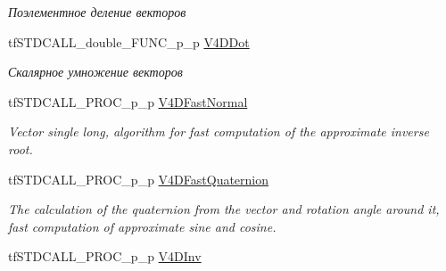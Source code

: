 \begin{DoxyCompactItemize}
\begin{DoxyCompactList}\small\item\em Поэлементное деление векторов \end{DoxyCompactList}\item 
\hypertarget{structs_functions_vector_c_p_u_a98050e36b034519869d873d3c4fab022}{tf\-S\-T\-D\-C\-A\-L\-L\-\_\-double\-\_\-\-F\-U\-N\-C\-\_\-p\-\_\-p \hyperlink{structs_functions_vector_c_p_u_a98050e36b034519869d873d3c4fab022}{V4\-D\-Dot}}\label{structs_functions_vector_c_p_u_a98050e36b034519869d873d3c4fab022}

\begin{DoxyCompactList}\small\item\em Скалярное умножение векторов \end{DoxyCompactList}\item 
\hypertarget{structs_functions_vector_c_p_u_a63b1e6bb5b43b6a398f61343a0495531}{tf\-S\-T\-D\-C\-A\-L\-L\-\_\-\-P\-R\-O\-C\-\_\-p\-\_\-p \hyperlink{structs_functions_vector_c_p_u_a63b1e6bb5b43b6a398f61343a0495531}{V4\-D\-Fast\-Normal}}\label{structs_functions_vector_c_p_u_a63b1e6bb5b43b6a398f61343a0495531}

\begin{DoxyCompactList}\small\item\em Vector single long, algorithm for fast computation of the approximate inverse root. \end{DoxyCompactList}\item 
\hypertarget{structs_functions_vector_c_p_u_a17f49d02344aee2061d371bf67ec71cc}{tf\-S\-T\-D\-C\-A\-L\-L\-\_\-\-P\-R\-O\-C\-\_\-p\-\_\-p \hyperlink{structs_functions_vector_c_p_u_a17f49d02344aee2061d371bf67ec71cc}{V4\-D\-Fast\-Quaternion}}\label{structs_functions_vector_c_p_u_a17f49d02344aee2061d371bf67ec71cc}

\begin{DoxyCompactList}\small\item\em The calculation of the quaternion from the vector and rotation angle around it, fast computation of approximate sine and cosine. \end{DoxyCompactList}\item 
\hypertarget{structs_functions_vector_c_p_u_a1afd2b24118295b59b3520135f167a93}{tf\-S\-T\-D\-C\-A\-L\-L\-\_\-\-P\-R\-O\-C\-\_\-p\-\_\-p \hyperlink{structs_functions_vector_c_p_u_a1afd2b24118295b59b3520135f167a93}{V4\-D\-Inv}}\label{structs_functions_vector_c_p_u_a1afd2b24118295b59b3520135f167a93}


\end{DoxyCompactItemize}
